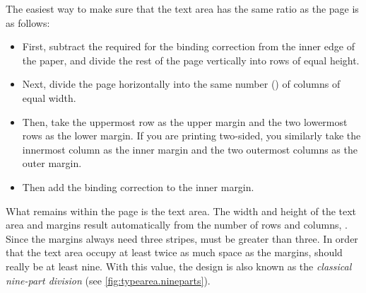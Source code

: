 \begin{Explain}
  The easiest way to make sure that the text area has the same ratio as the 
  page is as follows:
  \begin{itemize}
  \item First, subtract the  required for the binding
    correction from the inner edge of the paper, and
    divide the rest of the page vertically into  rows of equal
    height.
  \item Next, divide the page horizontally into the same number () of
    columns of equal width.
  \item Then, take the uppermost row as the upper margin and the two lowermost
    rows as the lower margin. If you are printing two-sided, you similarly
    take the innermost column as the inner margin and the two outermost
    columns as the outer margin.
  \item Then add the binding correction  to the inner margin.
  \end{itemize}
  What remains within the page is the text area. The width
  and height of the text area and margins result automatically from the
  number of rows and columns, . Since the margins always need three
  stripes,  must be greater than three. In order that the
  text area occupy at least twice as much space as the margins, 
  should really be at least nine. With this value, the design
  is also known as the \emph{classical nine-part division} (see
  \autoref{fig:typearea.nineparts}).


\end{Explain}
